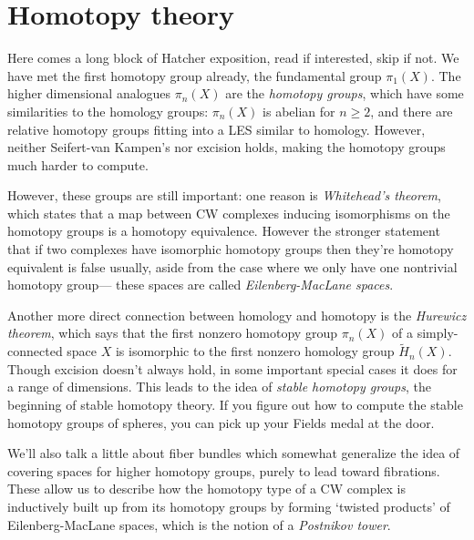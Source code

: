 \section{Homotopy theory} 
Here comes a long block of Hatcher exposition, read if interested, skip if not.
\orbreak
We have met the first homotopy group already, the fundamental group $\pi_1(X)$. The higher dimensional analogues $\pi_n (X)$ are the \emph{homotopy groups}, which have some similarities to the homology groups: $\pi_n (X)$ is abelian for $n\geq 2$, and there are relative homotopy groups fitting into a LES similar to homology. However, neither Seifert-van Kampen's nor excision holds, making the homotopy groups much harder to compute. 

However, these groups are still important: one reason is \emph{Whitehead's theorem}, which states that a map between CW complexes inducing isomorphisms on the homotopy groups is a homotopy equivalence. However the stronger statement that if two complexes have isomorphic homotopy groups then they're homotopy equivalent is false usually, aside from the case where we only have one nontrivial homotopy group— these spaces are called \emph{Eilenberg-MacLane spaces}.

Another more direct connection between homology and homotopy is the \emph{Hurewicz theorem}, which says that the first nonzero homotopy group $\pi_n (X)$ of a simply-connected space $X$ is isomorphic to the first nonzero homology group $\widetilde H_n (X)$. Though excision doesn't always hold, in some important special cases it does for a range of dimensions. This leads to the idea of \emph{stable homotopy groups}, the beginning of stable homotopy theory. If you figure out how to compute the stable homotopy groups of spheres, you can pick up your Fields medal at the door.

We'll also talk a little about fiber bundles which somewhat generalize the idea of covering spaces for higher homotopy groups, purely to lead toward fibrations. These allow us to describe how the homotopy type of a CW complex is inductively built up from its homotopy groups by forming `twisted products' of Eilenberg-MacLane spaces, which is the notion of a \emph{Postnikov tower}.
\orbreak
